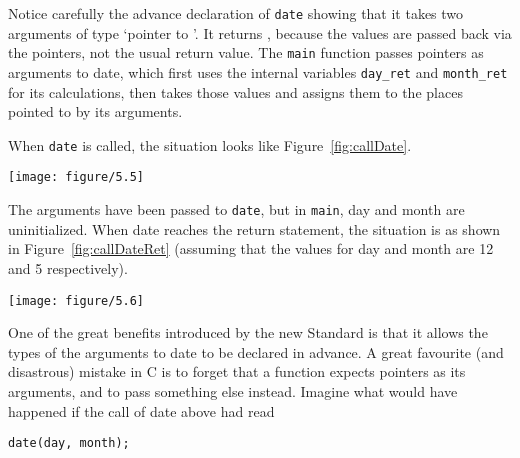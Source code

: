    Notice carefully the advance declaration of \texttt{date} showing
    that it takes two arguments of type `pointer to \kint{}'.
    It returns \void, because the values are passed back via the
    pointers, not the usual return value. The \texttt{main} function
    passes pointers as arguments to date, which first uses the internal
    variables \texttt{day\_ret} and \texttt{month\_ret} for its
    calculations, then takes those values and assigns them to the places
    pointed to by its arguments.


    When \texttt{date} is called,
    the situation looks like Figure~\ref{fig:callDate}.


   \begin{figure*}[htb]\centering
     \texttt{[image: figure/5.5]}
     \caption*{Diagram showing the variables 'day' and 'month'
       which have undefined values,
       and the pointers 'day\_p' and 'month\_p' which contain their addresses.}
     \caption{\label{fig:callDate}Just as \texttt\{date\} is called}
   \end{figure*}



   The arguments have been passed to \texttt{date}, but in
    \texttt{main}, day and month are uninitialized. When date reaches
    the return statement,
    the situation is as shown in Figure~\ref{fig:callDateRet}
    (assuming that the values for day and month are 12 and
    5 respectively).


    \begin{figure*}[htb]\centering
      \texttt{[image: figure/5.6]}
      \caption*{Diagram showing the same variables as Figure~\ref{fig:callDate},
        except that the 'day' and 'month'
        now have the values '12' and '5' respectively.}
      \caption{\label{fig:callDateRet}Just as \texttt\{date\} is about to return}
    \end{figure*}



   One of the great benefits introduced by the new Standard is that it
    allows the types of the arguments to date to be declared in advance.
    A great favourite (and disastrous) mistake in C is to forget that
    a function expects pointers as its arguments, and to pass something else
    instead. Imagine what would have happened if the call of date above had
    read


   \begin{Verbatim}
date(day, month);
\end{Verbatim}

